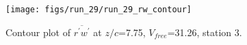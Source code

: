 \begin{figure}[H]
\centering
\texttt{[image: figs/run\_29/run\_29\_rw\_contour]}
\caption{Contour plot of $\overline{r^\prime w^\prime}$ at $z/c$=7.75, $V_{free}$=31.26, station 3.}
\label{fig:run_29_rw_contour}
\end{figure}


